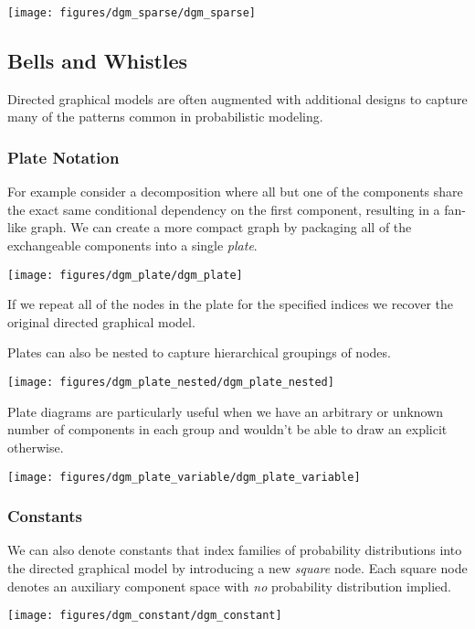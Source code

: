 \documentclass[]{article}
\begin{document}
\texttt{[image: figures/dgm\_sparse/dgm\_sparse]}

\hypertarget{bells-and-whistles}{%
\subsection{Bells and Whistles}\label{bells-and-whistles}}

Directed graphical models are often augmented with additional designs to
capture many of the patterns common in probabilistic modeling.

\hypertarget{plate-notation}{%
\subsubsection{Plate Notation}\label{plate-notation}}

For example consider a decomposition where all but one of the components
share the exact same conditional dependency on the first component,
resulting in a fan-like graph. We can create a more compact graph by
packaging all of the exchangeable components into a single \emph{plate}.

\texttt{[image: figures/dgm\_plate/dgm\_plate]}

If we repeat all of the nodes in the plate for the specified indices we
recover the original directed graphical model.

Plates can also be nested to capture hierarchical groupings of nodes.

\texttt{[image: figures/dgm\_plate\_nested/dgm\_plate\_nested]}

Plate diagrams are particularly useful when we have an arbitrary or
unknown number of components in each group and wouldn't be able to draw
an explicit otherwise.

\texttt{[image: figures/dgm\_plate\_variable/dgm\_plate\_variable]}

\hypertarget{constants}{%
\subsubsection{Constants}\label{constants}}

We can also denote constants that index families of probability
distributions into the directed graphical model by introducing a new
\emph{square} node. Each square node denotes an auxiliary component
space with \emph{no} probability distribution implied.

\texttt{[image: figures/dgm\_constant/dgm\_constant]}
\end{document}
